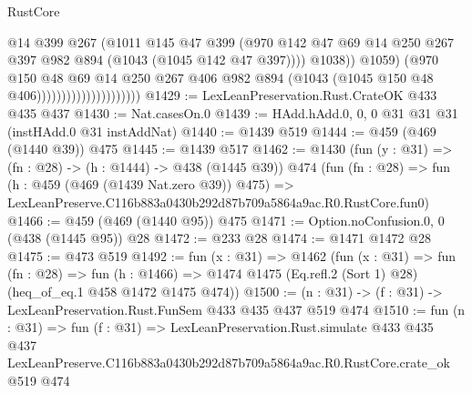 \begin{lexlean}{RustCore}
\begin{coremodule}
                                              @14
                                              @399
                                              @267
                                              (@1011
                                                @145
                                                @47
                                                @399
                                                (@970
                                                  @142
                                                  @47
                                                  @69
                                                  @14
                                                  @250
                                                  @267
                                                  @397
                                                  @982
                                                  @894
                                                  (@1043 (@1045 @142 @47 @397))))
                                              @1038))
                                          @1059)
                                        (@970
                                          @150
                                          @48
                                          @69
                                          @14
                                          @250
                                          @267
                                          @406
                                          @982
                                          @894
                                          (@1043 (@1045 @150 @48 @406)))))))))))))))))))))
@1429 := LexLeanPreservation.Rust.CrateOK @433 @435 @437
@1430 := Nat.casesOn.{0}
@1439 := HAdd.hAdd.{0, 0, 0} @31 @31 @31 (instHAdd.{0} @31 instAddNat)
@1440 := @1439 @519
@1444 := @459 (@469 (@1440 @39)) @475
@1445 := @1439 @517
@1462 := @1430
    (fun (y : @31) => (fn : @28) -> (h : @1444) -> @438 (@1445 @39))
    @474
    (fun (fn : @28) =>
    fun (h : @459 (@469 (@1439 Nat.zero @39)) @475) =>
    LexLeanPreserve.C116b883a0430b292d87b709a5864a9ac.R0.RustCore.fun0)
@1466 := @459 (@469 (@1440 @95)) @475
@1471 := Option.noConfusion.{0, 0} (@438 (@1445 @95)) @28
@1472 := @233 @28
@1474 := @1471 @1472 @28
@1475 := @473 @519
@1492 := fun (x : @31) =>
  @1462
    (fun (x : @31) =>
    fun (fn : @28) =>
    fun (h : @1466) => @1474 @1475 (Eq.refl.{2} (Sort 1) @28) (heq_of_eq.{1} @458 @1472 @1475 @474))
@1500 := (n : @31) -> (f : @31) -> LexLeanPreservation.Rust.FunSem @433 @435 @437 @519 @474
@1510 := fun (n : @31) =>
  fun (f : @31) =>
  LexLeanPreservation.Rust.simulate
    @433
    @435
    @437
    LexLeanPreserve.C116b883a0430b292d87b709a5864a9ac.R0.RustCore.crate_ok
    @519
    @474
\end{coremodule}
\end{lexlean}
